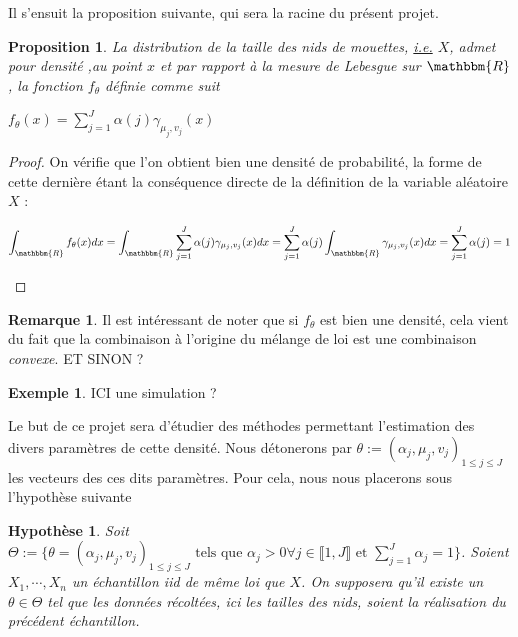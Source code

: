 \documentclass[frenchb]{report}
\newcommand{\R}{\mathbbm{R}}
\newcommand{\1}{\mathbbm{1}}
\newtheorem{prop}{Proposition}
\newtheorem{hyp}{Hypothèse}
\theoremstyle{definition}\newtheorem{defn}{Définition}
\theoremstyle{definition}\newtheorem{exm}{Exemple}
\theoremstyle{definition}\newtheorem{nota}{Notation}
\theoremstyle{definition}\newtheorem{rem}{Remarque}
\begin{document}
Il s'ensuit la proposition suivante, qui sera la racine du présent projet.
\begin{prop}
La distribution de la taille des nids de mouettes, \underline{i.e.} $X$, admet pour densité ,au point $x$ et par rapport à la mesure de Lebesgue sur $\R$, la fonction $f_ \theta$ définie comme suit
\begin{center} $f_\theta(x) = \displaystyle\sum_{j=1}^J \alpha(j) \gamma_{\mu_j, v_j}(x) $ \end{center}
\end{prop}

\begin{proof}
On vérifie que l'on obtient bien une densité de probabilité, la forme de cette dernière étant la conséquence directe de la définition de la variable aléatoire $X$ : \newline
\begin{center} $\displaystyle\int_\R f_\theta(x) dx = \int_\R\sum_{j=1}^J \alpha(j) \gamma_{\mu_j, v_j}(x)dx = \sum_{j=1}^J\alpha(j)\int_\R \gamma_{\mu_j, v_j}(x)dx = \sum_{j=1}^J\alpha(j) = 1$ \end{center}
\end{proof}

\begin{rem}
Il est intéressant de noter que si $f_\theta$ est bien une densité, cela vient du fait que la combinaison à l'origine du mélange de loi est une combinaison \textit{convexe}. ET SINON ?
\end{rem}

\begin{exm}
ICI une simulation ?
\end{exm}

Le but de ce projet sera d'étudier des méthodes permettant l'estimation des divers paramètres de cette densité. Nous détonerons par $\theta := (\alpha_j, \mu_j, v_j)_{1\leq j\leq J}$ les vecteurs des ces dits paramètres. \newline
Pour cela, nous nous placerons sous l'hypothèse suivante

\begin{hyp}
Soit $\Theta := \{ \theta = (\alpha_j,\mu_j, v_j)_{1 \leq j \leq J} \text{ tels que } \alpha_j > 0 \forall j\in \llbracket 1,J\rrbracket \text{ et } \displaystyle\sum_{j=1}^J\alpha_j=1\}$. Soient $X_1, \cdots, X_n$ un échantillon iid de même loi que $X$. On supposera qu'il existe un $\theta \in \Theta$ tel que les données récoltées, ici les tailles des nids, soient la réalisation du précédent échantillon.
\end{hyp}
\end{document}
